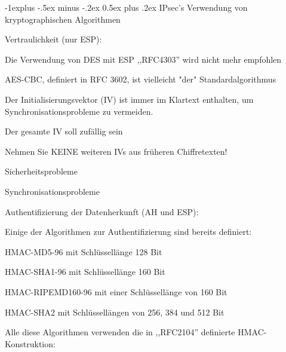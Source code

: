 \documentclass[a4paper]{article}
\makeatletter
\renewcommand{\subsection}{\@startsection{subsection}{2}{0mm}%
 {-1explus -.5ex minus -.2ex}%
 {0.5ex plus .2ex}%
 {\normalfont\normalsize\bfseries}}
\makeatother
\begin{document}
\begin{multicols}{3}
      \subsection{IPsec's Verwendung von kryptographischen Algorithmen}
      \begin{itemize*}
            \item Vertraulichkeit (nur ESP):
            \begin{itemize*}
                  \item Die Verwendung von DES mit ESP ,,RFC4303'' wird nicht mehr empfohlen
                  \item AES-CBC, definiert in RFC 3602, ist vielleicht "der" Standardalgorithmus
                  \item Der Initialisierungsvektor (IV) ist immer im Klartext enthalten, um Synchronisationsprobleme zu vermeiden.
                  \item Der gesamte IV soll zufällig sein
                  \item Nehmen Sie KEINE weiteren IVs aus früheren Chiffretexten!
                  \begin{itemize*}
                        \item Sicherheitsprobleme
                        \item Synchronisationsprobleme
                  \end{itemize*}
            \end{itemize*}
            \item Authentifizierung der Datenherkunft (AH und ESP):
            \begin{itemize*}
                  \item Einige der Algorithmen zur Authentifizierung sind bereits definiert:
                  \begin{itemize*} \item HMAC-MD5-96 mit Schlüssellänge 128 Bit \item HMAC-SHA1-96 mit Schlüssellänge 160 Bit \item HMAC-RIPEMD160-96 mit einer Schlüssellänge von 160 Bit \item HMAC-SHA2 mit Schlüssellängen von 256, 384 und 512 Bit \end{itemize*}
                  \item Alle diese Algorithmen verwenden die in ,,RFC2104'' definierte HMAC-Konstruktion:

\end{itemize*}
\end{itemize*}
\end{multicols}
\end{document}
